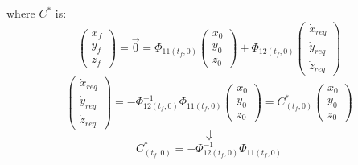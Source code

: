 \documentclass[11pt, a4paper]{article}
\begin{document}
where $C^*$ is:
\begin{equation*}
    \begin{pmatrix}
        x_f\\y_f\\z_f
    \end{pmatrix} = \vec{0} = \Phi_{11(t_f,0)}\begin{pmatrix}
        x_0\\y_0\\z_0
    \end{pmatrix} + \Phi_{12(t_f,0)}\begin{pmatrix}
        \dot{x}_{req}\\\dot{y}_{req}\\\dot{z}_{req}
    \end{pmatrix}
\end{equation*}
\begin{equation*}
    \begin{pmatrix}
        \dot{x}_{req}\\\dot{y}_{req}\\\dot{z}_{req}
    \end{pmatrix} = -\Phi_{12(t_f,0)}^{-1}\Phi_{11(t_f,0)}\begin{pmatrix}
        x_0\\y_0\\z_0
    \end{pmatrix} = C^*_{(t_f,0)}\begin{pmatrix}
        x_0\\y_0\\z_0
    \end{pmatrix}
\end{equation*}
\begin{equation*}
    \Downarrow
\end{equation*}
\begin{equation*}
    C^*_{(t_f,0)} = -\Phi_{12(t_f,0)}^{-1}\Phi_{11(t_f,0)}
\end{equation*}
\end{document}
